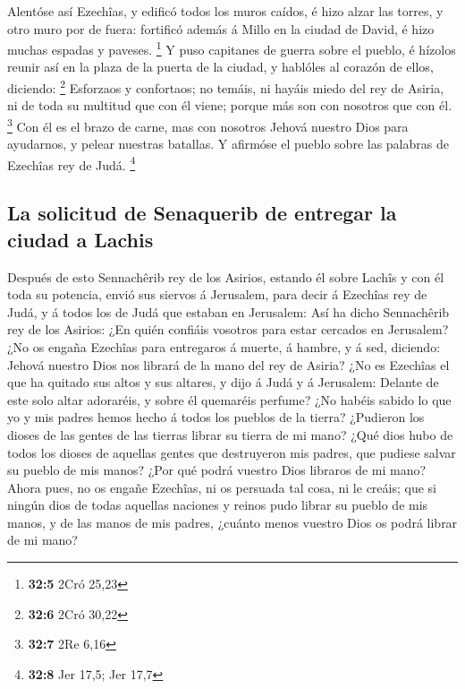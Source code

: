 Alentóse así Ezechîas, y edificó todos los muros caídos,
é hizo alzar las torres, y otro muro por de fuera: fortificó además á
Millo en la ciudad de David, é hizo muchas espadas y paveses.
\footnote{\textbf{32:5} 2Cró 25,23}  Y puso capitanes de
guerra sobre el pueblo, é hízolos reunir así en la plaza de la puerta de
la ciudad, y hablóles al corazón de ellos, diciendo: \footnote{\textbf{32:6}
  2Cró 30,22}  Esforzaos y confortaos; no temáis, ni
hayáis miedo del rey de Asiria, ni de toda su multitud que con él viene;
porque más son con nosotros que con él. \footnote{\textbf{32:7} 2Re 6,16}
 Con él es el brazo de carne, mas con nosotros Jehová
nuestro Dios para ayudarnos, y pelear nuestras batallas. Y afirmóse el
pueblo sobre las palabras de Ezechîas rey de Judá. \footnote{\textbf{32:8}
  Jer 17,5; Jer 17,7}

\hypertarget{la-solicitud-de-senaquerib-de-entregar-la-ciudad-a-lachis}{%
\subsection{La solicitud de Senaquerib de entregar la ciudad a
Lachis}\label{la-solicitud-de-senaquerib-de-entregar-la-ciudad-a-lachis}}

 Después de esto Sennachêrib rey de los Asirios, estando
él sobre Lachîs y con él toda su potencia, envió sus siervos á
Jerusalem, para decir á Ezechîas rey de Judá, y á todos los de Judá que
estaban en Jerusalem:  Así ha dicho Sennachêrib rey de
los Asirios: ¿En quién confiáis vosotros para estar cercados en
Jerusalem?  ¿No os engaña Ezechîas para entregaros á
muerte, á hambre, y á sed, diciendo: Jehová nuestro Dios nos librará de
la mano del rey de Asiria?  ¿No es Ezechîas el que ha
quitado sus altos y sus altares, y dijo á Judá y á Jerusalem: Delante de
este solo altar adoraréis, y sobre él quemaréis perfume? 
¿No habéis sabido lo que yo y mis padres hemos hecho á todos los pueblos
de la tierra? ¿Pudieron los dioses de las gentes de las tierras librar
su tierra de mi mano?  ¿Qué dios hubo de todos los dioses
de aquellas gentes que destruyeron mis padres, que pudiese salvar su
pueblo de mis manos? ¿Por qué podrá vuestro Dios libraros de mi mano?
 Ahora pues, no os engañe Ezechîas, ni os persuada tal
cosa, ni le creáis; que si ningún dios de todas aquellas naciones y
reinos pudo librar su pueblo de mis manos, y de las manos de mis padres,
¿cuánto menos vuestro Dios os podrá librar de mi mano?

